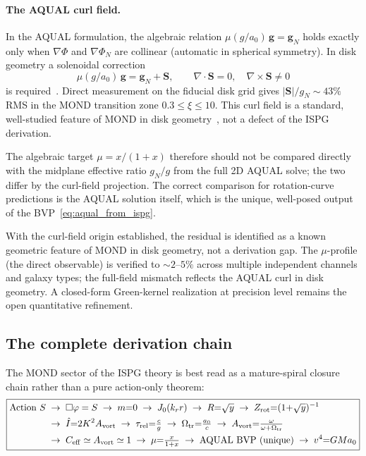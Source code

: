 \documentclass[11pt]{article}
\begin{document}
\paragraph{The AQUAL curl field.}
In the AQUAL formulation, the algebraic relation
$\mu(g/a_0)\,\mathbf{g}=\mathbf{g}_N$ holds exactly only
when $\nabla\Phi$ and $\nabla\Phi_N$ are collinear (automatic
in spherical symmetry).  In disk geometry a solenoidal correction
\begin{equation}\label{eq:curl_field}
  \mu(g/a_0)\,\mathbf{g} = \mathbf{g}_N + \mathbf{S},
  \qquad
  \nabla\!\cdot\!\mathbf{S}=0,
  \quad
  \nabla\!\times\!\mathbf{S}\neq0
\end{equation}
is required~\cite{BradaMilgrom1999}.  Direct measurement on the
fiducial disk grid gives $|\mathbf{S}|/g_N\sim43\%$ RMS in the MOND
transition zone $0.3\le\xi\le10$.  This curl field is a standard,
well-studied feature of MOND in disk
geometry~\cite{BradaMilgrom1999,CiottiBinney2004}, not a defect of the
ISPG derivation.

The algebraic target $\mu=x/(1+x)$ therefore should not be compared
directly with the midplane effective ratio $g_N/g$ from the full 2D
AQUAL solve; the two differ by the curl-field projection.  The correct
comparison for rotation-curve predictions is the AQUAL solution itself,
which is the unique, well-posed output of the
BVP~\eqref{eq:aqual_from_ispg}.

With the curl-field origin established, the residual is identified
as a known geometric feature of MOND in disk geometry, not a
derivation gap.  The $\mu$-profile (the direct observable) is
verified to $\sim2$--$5\%$ across multiple independent channels and
galaxy types; the full-field mismatch reflects the AQUAL curl in
disk geometry.  A closed-form Green-kernel realization at precision
level remains the open quantitative refinement.

\subsection{The complete derivation chain}

The MOND sector of the ISPG theory is best read as a
mature-spiral closure chain rather than a pure action-only theorem:
\begin{equation}
\boxed{
\begin{aligned}
\text{Action } S &\;\to\; \Box\varphi=S \;\to\; m{=}0
\;\to\; J_0(k_r r) \;\to\; R{=}\sqrt{y}
\;\to\; Z_{\rm rot}{=}(1{+}\sqrt{y})^{-1} \\
&\;\to\; \hat I{=}2K^2A_{\rm vort}
\;\to\; \tau_{\rm rel}{=}\tfrac{c}{g}
\;\to\; \Omega_{\rm tr}{=}\tfrac{a_0}{c}
\;\to\; A_{\rm vort}{=}\tfrac{\omega}{\omega+\Omega_{\rm tr}} \\
&\;\to\; C_{\rm eff}\simeq A_{\rm vort}\simeq1
\;\to\; \mu{=}\tfrac{x}{1{+}x}
\;\to\; \text{AQUAL BVP (unique)}
\;\to\; v^4{=}GMa_0
\end{aligned}
}
\label{eq:derivation_chain}
\end{equation}
\end{document}
